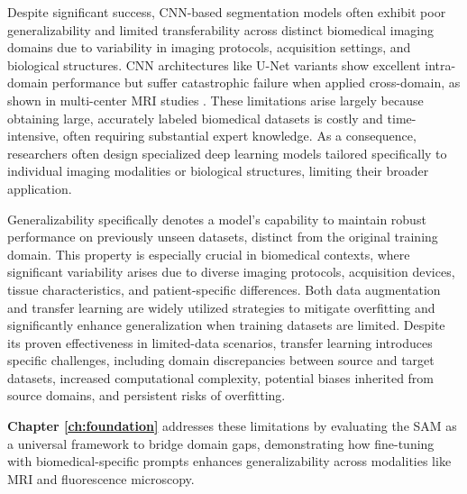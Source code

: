 \documentclass[./dissertation.tex]{subfiles}
\begin{document}
\textcolor{BulldogRed}{Despite significant success, CNN-based segmentation models often exhibit poor generalizability and limited transferability across distinct biomedical imaging domains due to variability in imaging protocols, acquisition settings, and biological structures. CNN architectures like U-Net variants show excellent intra-domain performance but suffer catastrophic failure when applied cross-domain, as shown in multi-center MRI studies \cite{de2023domain}. These limitations arise largely because obtaining large, accurately labeled biomedical datasets is costly and time-intensive, often requiring substantial expert knowledge. As a consequence, researchers often design specialized deep learning models tailored specifically to individual imaging modalities or biological structures, limiting their broader application.}

\textcolor{BulldogRed}{Generalizability specifically denotes a model’s capability to maintain robust performance on previously unseen datasets, distinct from the original training domain. This property is especially crucial in biomedical contexts, where significant variability arises due to diverse imaging protocols, acquisition devices, tissue characteristics, and patient-specific differences. Both data augmentation and transfer learning are widely utilized strategies to mitigate overfitting and significantly enhance generalization when training datasets are limited. Despite its proven effectiveness in limited-data scenarios, transfer learning introduces specific challenges, including domain discrepancies between source and target datasets, increased computational complexity, potential biases inherited from source domains, and persistent risks of overfitting.}

\textcolor{BulldogRed}{\textbf{Chapter \ref{ch:foundation}} addresses these limitations by evaluating the SAM \cite{kirillov2023segment} as a universal framework to bridge domain gaps, demonstrating how fine-tuning with biomedical-specific prompts enhances generalizability across modalities like MRI and fluorescence microscopy.}
\end{document}
